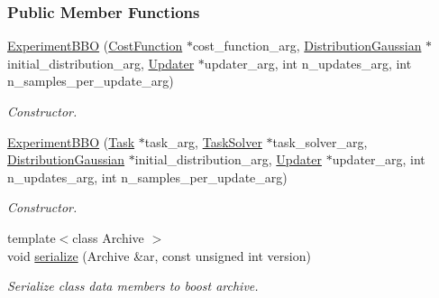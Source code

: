 \subsubsection*{Public Member Functions}
\begin{DoxyCompactItemize}
\item 
\hyperlink{classDmpBbo_1_1ExperimentBBO_a006c24e9940256c4cde3acfdafd16823}{Experiment\+B\+B\+O} (\hyperlink{classDmpBbo_1_1CostFunction}{Cost\+Function} $\ast$cost\+\_\+function\+\_\+arg, \hyperlink{classDmpBbo_1_1DistributionGaussian}{Distribution\+Gaussian} $\ast$initial\+\_\+distribution\+\_\+arg, \hyperlink{classDmpBbo_1_1Updater}{Updater} $\ast$updater\+\_\+arg, int n\+\_\+updates\+\_\+arg, int n\+\_\+samples\+\_\+per\+\_\+update\+\_\+arg)
\begin{DoxyCompactList}\small\item\em Constructor. \end{DoxyCompactList}\item 
\hyperlink{classDmpBbo_1_1ExperimentBBO_a43f05ceb258b4b6bc8cdf82b8eabfb15}{Experiment\+B\+B\+O} (\hyperlink{classDmpBbo_1_1Task}{Task} $\ast$task\+\_\+arg, \hyperlink{classDmpBbo_1_1TaskSolver}{Task\+Solver} $\ast$task\+\_\+solver\+\_\+arg, \hyperlink{classDmpBbo_1_1DistributionGaussian}{Distribution\+Gaussian} $\ast$initial\+\_\+distribution\+\_\+arg, \hyperlink{classDmpBbo_1_1Updater}{Updater} $\ast$updater\+\_\+arg, int n\+\_\+updates\+\_\+arg, int n\+\_\+samples\+\_\+per\+\_\+update\+\_\+arg)
\begin{DoxyCompactList}\small\item\em Constructor. \end{DoxyCompactList}\item 
{\footnotesize template$<$class Archive $>$ }\\void \hyperlink{classDmpBbo_1_1ExperimentBBO_a68e832cb064e3b7ca978d8e5911cf700}{serialize} (Archive \&ar, const unsigned int version)
\begin{DoxyCompactList}\small\item\em Serialize class data members to boost archive. \end{DoxyCompactList}\end{DoxyCompactItemize}
